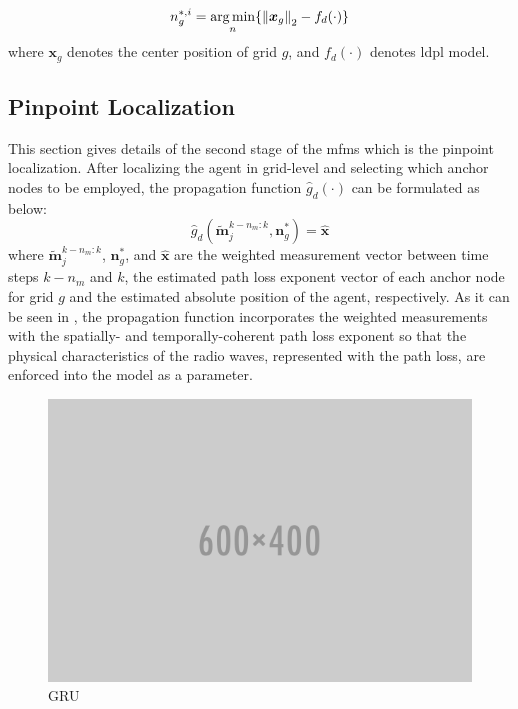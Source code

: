     \begin{equation}
        n^{*,i}_g = \operatorname*{arg\,min}_n\{ \left\lVert\bm{x}_g\right\rVert_2 - f_d(\cdot)\}
    \end{equation}
    where $\bm{x}_g$ denotes the center position of grid $g$, and $f_d(\cdot)$ denotes \gls{ldpl} model.

    \subsection{Pinpoint Localization}
    This section gives details of the second stage of the \gls{mfms} which is the pinpoint localization.
    After localizing the agent in grid-level and selecting which anchor nodes to be employed, the propagation function $\hat{g}_d(\cdot)$ can be formulated as below:
    \begin{equation}
        \label{eq:propfunct}
        \hat{g}_d(\bm{\widetilde{m}}^{k-n_{m}:k}_j, \bm{n}^*_g)= \bm{\hat{x}}
    \end{equation}
    where $\bm{\widetilde{m}}^{k-n_{m}:k}_j$, $\bm{n}^*_g$, and $\bm{\hat{x}}$ are the weighted measurement vector between time steps $k-n_m$ and $k$, the estimated path loss exponent vector of each anchor node for grid $g$ and the estimated absolute position of the agent, respectively.
    As it can be seen in , the propagation function incorporates the weighted measurements with the spatially- and temporally-coherent path loss exponent so that the physical characteristics of the radio waves, represented with the path loss, are enforced into the model as a parameter.

    \begin{figure}[thpb]
       \centering
       \includegraphics[width=\linewidth]{figures/placeholder.png}
       \caption{\label{fig:gru}GRU}
    \end{figure}

